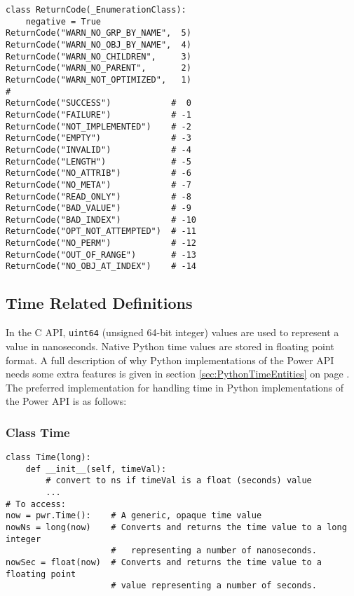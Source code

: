 \documentclass[12pt]{report} %
\begin{document}
\begin{appendices}
\begin{center}\begin{minipage}{.95\linewidth}\begin{lstlisting}
class ReturnCode(_EnumerationClass):
    negative = True
ReturnCode("WARN_NO_GRP_BY_NAME",  5)
ReturnCode("WARN_NO_OBJ_BY_NAME",  4)
ReturnCode("WARN_NO_CHILDREN",     3)
ReturnCode("WARN_NO_PARENT",       2)
ReturnCode("WARN_NOT_OPTIMIZED",   1)
#
ReturnCode("SUCCESS")            #  0
ReturnCode("FAILURE")            # -1
ReturnCode("NOT_IMPLEMENTED")    # -2
ReturnCode("EMPTY")              # -3
ReturnCode("INVALID")            # -4
ReturnCode("LENGTH")             # -5
ReturnCode("NO_ATTRIB")          # -6
ReturnCode("NO_META")            # -7
ReturnCode("READ_ONLY")          # -8
ReturnCode("BAD_VALUE")          # -9
ReturnCode("BAD_INDEX")          # -10
ReturnCode("OPT_NOT_ATTEMPTED")  # -11
ReturnCode("NO_PERM")            # -12
ReturnCode("OUT_OF_RANGE")       # -13
ReturnCode("NO_OBJ_AT_INDEX")    # -14
\end{lstlisting}\end{minipage}\end{center}

\subsection{Time Related Definitions}
\label{sec:PythonTimeRelatedDefinitions}

In the C API, \texttt{uint64} (unsigned 64-bit integer) values are used to represent a
value in nanoseconds. Native Python time values are stored in floating point
format. A full description of why Python implementations of the Power API needs
some extra features is given in section \ref{sec:PythonTimeEntities} on page
\pageref{sec:PythonTimeEntities}. The preferred implementation for handling
time in Python implementations of the Power API is as follows:

\subsubsection{Class Time} \label{class:Time}

\begin{center}\begin{minipage}{.95\linewidth}\begin{lstlisting}
class Time(long):
    def __init__(self, timeVal):
        # convert to ns if timeVal is a float (seconds) value
        ...
# To access:
now = pwr.Time():    # A generic, opaque time value
nowNs = long(now)    # Converts and returns the time value to a long integer
                     #   representing a number of nanoseconds.
nowSec = float(now)  # Converts and returns the time value to a floating point
                     # value representing a number of seconds.
\end{lstlisting}\end{minipage}\end{center}


\end{appendices}
\end{document}
